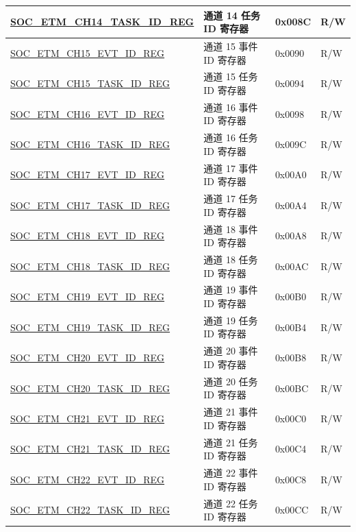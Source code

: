 \begin{longtable}{ | p{6cm} | p{6.4cm} | p{1.3cm} | p{1.8cm} | }
\hyperref[regdesc:SOCETMCH0TASKIDREG]{SOC\_ETM\_CH14\_TASK\_ID\_REG} & 通道 14 任务 ID 寄存器 & 0x008C & R/W \\ \hline
\hyperref[regdesc:SOCETMCH0EVTIDREG]{SOC\_ETM\_CH15\_EVT\_ID\_REG} & 通道 15 事件 ID 寄存器 & 0x0090 & R/W \\ \hline
\hyperref[regdesc:SOCETMCH0TASKIDREG]{SOC\_ETM\_CH15\_TASK\_ID\_REG} & 通道 15 任务 ID 寄存器 & 0x0094 & R/W \\ \hline
\hyperref[regdesc:SOCETMCH0EVTIDREG]{SOC\_ETM\_CH16\_EVT\_ID\_REG} & 通道 16 事件 ID 寄存器 & 0x0098 & R/W \\ \hline
\hyperref[regdesc:SOCETMCH0TASKIDREG]{SOC\_ETM\_CH16\_TASK\_ID\_REG} & 通道 16 任务 ID 寄存器 & 0x009C & R/W \\ \hline
\hyperref[regdesc:SOCETMCH0EVTIDREG]{SOC\_ETM\_CH17\_EVT\_ID\_REG} & 通道 17 事件 ID 寄存器 & 0x00A0 & R/W \\ \hline
\hyperref[regdesc:SOCETMCH0TASKIDREG]{SOC\_ETM\_CH17\_TASK\_ID\_REG} & 通道 17 任务 ID 寄存器 & 0x00A4 & R/W \\ \hline
\hyperref[regdesc:SOCETMCH0EVTIDREG]{SOC\_ETM\_CH18\_EVT\_ID\_REG} & 通道 18 事件 ID 寄存器 & 0x00A8 & R/W \\ \hline
\hyperref[regdesc:SOCETMCH0TASKIDREG]{SOC\_ETM\_CH18\_TASK\_ID\_REG} & 通道 18 任务 ID 寄存器 & 0x00AC & R/W \\ \hline
\hyperref[regdesc:SOCETMCH0EVTIDREG]{SOC\_ETM\_CH19\_EVT\_ID\_REG} & 通道 19 事件 ID 寄存器 & 0x00B0 & R/W \\ \hline
\hyperref[regdesc:SOCETMCH0TASKIDREG]{SOC\_ETM\_CH19\_TASK\_ID\_REG} & 通道 19 任务 ID 寄存器 & 0x00B4 & R/W \\ \hline
\hyperref[regdesc:SOCETMCH0EVTIDREG]{SOC\_ETM\_CH20\_EVT\_ID\_REG} & 通道 20 事件 ID 寄存器 & 0x00B8 & R/W \\ \hline
\hyperref[regdesc:SOCETMCH0TASKIDREG]{SOC\_ETM\_CH20\_TASK\_ID\_REG} & 通道 20 任务 ID 寄存器 & 0x00BC & R/W \\ \hline
\hyperref[regdesc:SOCETMCH0EVTIDREG]{SOC\_ETM\_CH21\_EVT\_ID\_REG} & 通道 21 事件 ID 寄存器 & 0x00C0 & R/W \\ \hline
\hyperref[regdesc:SOCETMCH0TASKIDREG]{SOC\_ETM\_CH21\_TASK\_ID\_REG} & 通道 21 任务 ID 寄存器 & 0x00C4 & R/W \\ \hline
\hyperref[regdesc:SOCETMCH0EVTIDREG]{SOC\_ETM\_CH22\_EVT\_ID\_REG} & 通道 22 事件 ID 寄存器 & 0x00C8 & R/W \\ \hline
\hyperref[regdesc:SOCETMCH0TASKIDREG]{SOC\_ETM\_CH22\_TASK\_ID\_REG} & 通道 22 任务 ID 寄存器 & 0x00CC & R/W \\ \hline

\end{longtable}
